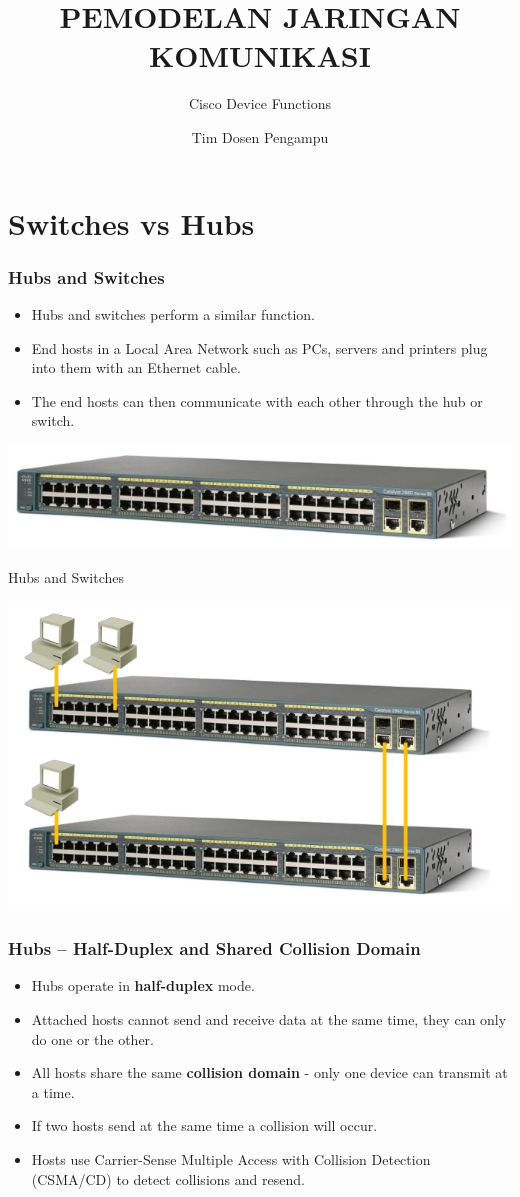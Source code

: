 \documentclass[pdflatex,compress,mathserif]{beamer}
\title{PEMODELAN JARINGAN KOMUNIKASI}
\subtitle{Cisco Device Functions}
\author{Tim Dosen Pengampu}
\begin{document}
\maketitle

\section{Switches vs Hubs}

\begin{frame}
	\frametitle{Hubs and Switches}
	\begin{itemize}
		\item Hubs and switches perform a similar function.
		\item End hosts in a Local Area Network such as PCs, servers and printers plug into them with an Ethernet cable.
		\item The end hosts can then communicate with each other through the hub or switch.
	\end{itemize}
	\begin{center}
		\includegraphics[width=0.6\linewidth]{img/img01}
	\end{center}
\end{frame}

\begin{frame}{Hubs and Switches}
	\begin{center}
		\includegraphics[width=0.7\linewidth]{img/img02}
	\end{center}
\end{frame}

\begin{frame}
	\frametitle{Hubs – Half-Duplex and Shared Collision Domain}
	\begin{itemize}
		\item Hubs operate in \textbf{half-duplex} mode.
		\item Attached hosts cannot send and receive data at the same time, they can only do one or the other.
		\item All hosts share the same \textbf{collision domain} - only one device can transmit at a time.
		\item If two hosts send at the same time a collision will occur.
		\item Hosts use Carrier-Sense Multiple Access with Collision Detection (CSMA/CD) to detect collisions and resend.
	\end{itemize}
\end{frame}
\end{document}
